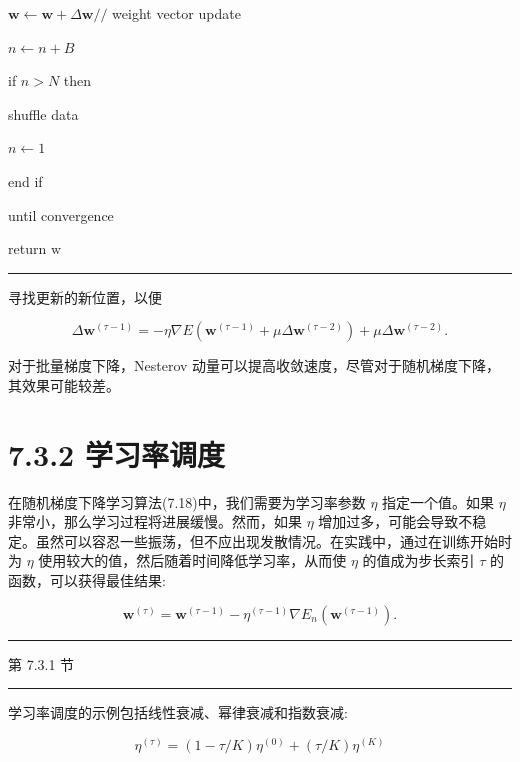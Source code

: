 \documentclass[10pt]{article}
\newcommand{\HRule}{\begin{center}\rule{0.9\linewidth}{0.2mm}\end{center}}
\begin{document}
\hspace*{1em} \(\mathbf{w} \leftarrow  \mathbf{w} + \Delta \mathbf{w}//\) weight vector update

\hspace*{1em} \(n \leftarrow  n + B\)

\hspace*{1em} if \(n > N\) then

\hspace*{2em} shuffle data

\hspace*{2em} \(n \leftarrow  1\)

\hspace*{1em} end if

until convergence

return \(\mathrm{w}\)

\HRule

寻找更新的新位置，以便

\[
\Delta {\mathbf{w}}^{\left( \tau  - 1\right) } =  - \eta \nabla E\left( {{\mathbf{w}}^{\left( \tau  - 1\right) } + {\mu \Delta }{\mathbf{w}}^{\left( \tau  - 2\right) }}\right)  + {\mu \Delta }{\mathbf{w}}^{\left( \tau  - 2\right) }. \tag{7.34}
\]

对于批量梯度下降，Nesterov 动量可以提高收敛速度，尽管对于随机梯度下降，其效果可能较差。

\section*{7.3.2 学习率调度}

在随机梯度下降学习算法(7.18)中，我们需要为学习率参数 \(\eta\) 指定一个值。如果 \(\eta\) 非常小，那么学习过程将进展缓慢。然而，如果 \(\eta\) 增加过多，可能会导致不稳定。虽然可以容忍一些振荡，但不应出现发散情况。在实践中，通过在训练开始时为 \(\eta\) 使用较大的值，然后随着时间降低学习率，从而使 \(\eta\) 的值成为步长索引 \(\tau\) 的函数，可以获得最佳结果:

\[
{\mathbf{w}}^{\left( \tau \right) } = {\mathbf{w}}^{\left( \tau  - 1\right) } - {\eta }^{\left( \tau  - 1\right) }\nabla {E}_{n}\left( {\mathbf{w}}^{\left( \tau  - 1\right) }\right) . \tag{7.35}
\]

\HRule

第 7.3.1 节

\HRule

学习率调度的示例包括线性衰减、幂律衰减和指数衰减:

\[
{\eta }^{\left( \tau \right) } = \left( {1 - \tau /K}\right) {\eta }^{\left( 0\right) } + \left( {\tau /K}\right) {\eta }^{\left( K\right) } \tag{7.36}
\]
\end{document}
